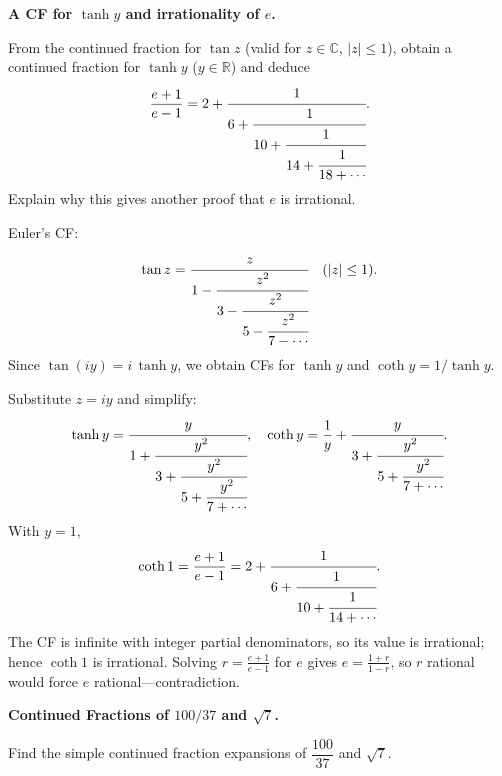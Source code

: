 \begin{problem}[CP-II-0111]
\label{prob:cp-ii-0111}
\textbf{A CF for $\tanh y$ and irrationality of $e$.}

\hspace*{1.5em}From the continued fraction for $\tan z$ (valid for $z\in\mathbb C$, $|z|\le 1$), obtain a continued fraction for $\tanh y$ ($y\in\mathbb R$) and deduce
\[
\frac{e+1}{e-1}=2+\cfrac{1}{6+\cfrac{1}{10+\cfrac{1}{14+\cfrac{1}{18+\cdots}}}}.
\]
Explain why this gives another proof that $e$ is irrational.

Euler's CF:
\[
\tan z=\cfrac{z}{1-\cfrac{z^{2}}{3-\cfrac{z^{2}}{5-\cfrac{z^{2}}{7-\cdots}}}}
\quad (|z|\le1).
\]
Since $\tan(i y)= i\,\tanh y$, we obtain CFs for $\tanh y$ and $\coth y=1/\tanh y$.
\end{problem}

\begin{solution}
Substitute $z=i y$ and simplify:
\[
\tanh y=\cfrac{y}{1+\cfrac{y^{2}}{3+\cfrac{y^{2}}{5+\cfrac{y^{2}}{7+\cdots}}}},
\quad
\coth y=\frac{1}{y}+\cfrac{y}{3+\cfrac{y^{2}}{5+\cfrac{y^{2}}{7+\cdots}}}.
\]
With $y=1$,
\[
\coth 1=\frac{e+1}{e-1}
=2+\cfrac{1}{6+\cfrac{1}{10+\cfrac{1}{14+\cdots}}}.
\]
The CF is infinite with integer partial denominators, so its value is irrational; hence
$\coth 1$ is irrational. Solving $r=\frac{e+1}{e-1}$ for $e$ gives $e=\frac{1+r}{1-r}$,
so $r$ rational would force $e$ rational---contradiction.

\bigskip
\end{solution}

\begin{problem}[CP-II-0143]
\label{prob:cp-ii-0143}
\textbf{Continued Fractions of \(100/37\) and \(\sqrt 7\).}

	Find the simple continued fraction expansions of $\dfrac{100}{37}$ and $\sqrt7$.
\end{problem}


